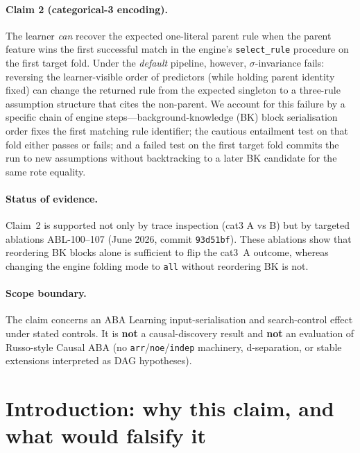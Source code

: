 \documentclass[11pt,a4paper]{article}
\begin{document}
\paragraph{Claim 2 (categorical-3 encoding).} The learner \emph{can} recover the expected
one-literal parent rule when the parent feature wins the first successful match in the engine's
\texttt{select\_rule} procedure on the first target fold. Under the \emph{default} pipeline,
however, $\sigma$-invariance fails: reversing the learner-visible order of predictors (while
holding parent identity fixed) can change the returned rule from the expected singleton to a
three-rule assumption structure that cites the non-parent. We account for this failure by a
specific chain of engine steps---background-knowledge (BK) block serialisation order fixes the
first matching rule identifier; the cautious entailment test on that fold either passes or
fails; and a failed test on the first target fold commits the run to new assumptions without
backtracking to a later BK candidate for the same rote equality.

\paragraph{Status of evidence.} Claim~2 is supported not only by trace inspection (cat3 A vs B)
but by targeted ablations ABL-100--107 (June 2026, commit \texttt{93d51bf}). These ablations
show that reordering BK blocks alone is sufficient to flip the cat3~A outcome, whereas changing
the engine folding mode to \texttt{all} without reordering BK is not.

\paragraph{Scope boundary.} The claim concerns an ABA Learning input-serialisation and
search-control effect under stated controls. It is \textbf{not} a causal-discovery result and
\textbf{not} an evaluation of Russo-style Causal ABA (no \texttt{arr}/\texttt{noe}/\texttt{indep}
machinery, d-separation, or stable extensions interpreted as DAG hypotheses).

\section{Introduction: why this claim, and what would falsify it}
\end{document}
